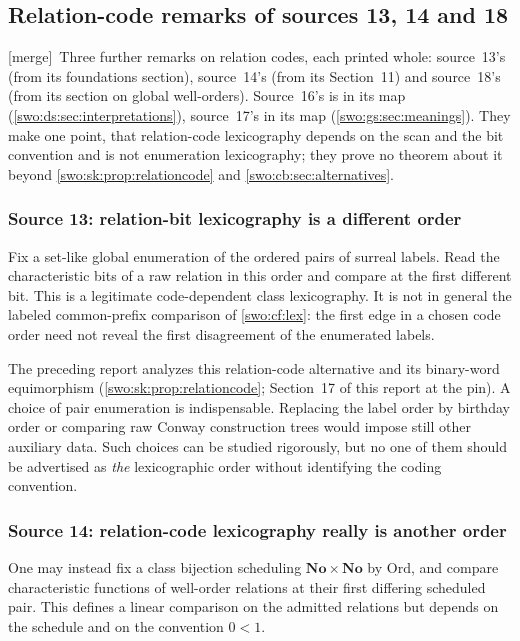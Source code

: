 \documentclass[11pt]{article}
\theoremstyle{definition}
\theoremstyle{remark}
\newcommand{\No}{\mathbf{No}}
\newcommand{\Ord}{\mathrm{Ord}}
\newcommand{\merge}{\textsf{[merge]}}
\begin{document}
\subsection{Relation-code remarks of sources 13, 14 and 18}\label{swo:vii:sub:relcodes}

\merge\ Three further remarks on relation codes, each printed whole:
source~13's (from its foundations section), source~14's (from its Section~11)
and source~18's (from its section on global well-orders). Source~16's is in
its map (\cref{swo:ds:sec:interpretations}), source~17's in its map
(\cref{swo:gs:sec:meanings}). They make one point, that relation-code
lexicography depends on the scan and the bit convention and is not
enumeration lexicography; they prove no theorem about it beyond
\cref{swo:sk:prop:relationcode} and \cref{swo:cb:sec:alternatives}.

\subsubsection{Source 13: relation-bit lexicography is a different order}

Fix a set-like global enumeration of the ordered pairs of surreal
labels. Read the characteristic bits of a raw relation in this order
and compare at the first different bit. This is a legitimate
code-dependent class lexicography. It is not in general the labeled
common-prefix comparison of \cref{swo:cf:lex}: the first edge
in a chosen code order need not reveal the first disagreement of the
enumerated labels.

The preceding report analyzes this relation-code alternative and its
binary-word equimorphism (\cref{swo:sk:prop:relationcode}; Section~17 of this report at the pin). A choice of
pair enumeration is indispensable. Replacing the label order by
birthday order or comparing raw Conway construction trees would impose
still other auxiliary data. Such choices can be studied rigorously,
but no one of them should be advertised as \emph{the} lexicographic
order without identifying the coding convention.

\subsubsection{Source 14: relation-code lexicography really is another order}
One may instead fix a class bijection scheduling $\No\times\No$ by
$\Ord$, and compare characteristic functions of well-order relations
at their first differing scheduled pair. This defines a linear
comparison on the admitted relations but depends on the schedule and
on the convention $0<1$.
\end{document}
